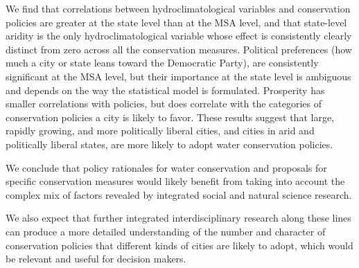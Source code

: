 \documentclass[draft,linenumbers]{agujournal}
\begin{document}
We find that correlations between
hydroclimatological variables
and conservation policies are greater at the state level than at
the MSA level, and that state-level aridity is the only hydroclimatological
variable whose effect is consistently clearly distinct
from zero across all the conservation measures.
Political preferences (how much a city or state leans toward the Democratic
Party), are consistently significant at the MSA level, but their importance at the state
level is ambiguous and depends on the way the statistical model is formulated.
Prosperity has smaller correlations with policies, but
does correlate with the
categories of conservation policies a city is likely to favor.
These results suggest that large, rapidly growing, and more politically liberal
cities, and cities in arid and politically liberal states,
are
more likely to
adopt water conservation policies.

We conclude that policy
rationales for water conservation and proposals for specific conservation measures
would likely benefit from taking into account the complex mix of factors revealed
by integrated social and natural science research.

We also expect that further integrated interdisciplinary research along
these lines can produce a more detailed understanding of the number and character
of conservation policies that different kinds of cities are likely to adopt,
which would be relevant and useful for decision makers.
\end{document}
